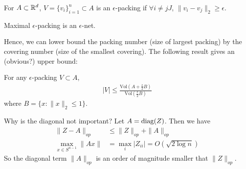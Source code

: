 \begin{definition}[Packing]
  For $A \subset \mathbb{R}^d$, $V = \{v_i\}_{i=1}^n \subset A$ is an
  $\epsilon$-packing if $\forall i \neq jJ$, $\| v_i - v_j\|_2 \geq \epsilon$.
\end{definition}

\begin{theorem}
  Maximal $\epsilon$-packing is an $\epsilon$-net.
\end{theorem}

Hence, we can lower bound the packing number (size of largest packing)
by the covering number (size of the smallest covering).
The following result gives an (obvious?) upper bound:

\begin{lemma}
  For any $\epsilon$-packing $V \subset A$,
  \begin{align}
    \lvert V \rvert
    \leq \frac{\text{Vol}(A + \frac{\epsilon}{2} B)}{\text{Vol}(\frac{\epsilon}{2} B)}
  \end{align}
  where $B = \{x : \|x\|_2 \leq 1\}$.
\end{lemma}


Why is the diagonal not important? Let $A = \operatorname{diag}(Z)$. Then we have
\begin{align}
  \|Z - A\|_{op}
  &\leq \|Z\|_{op} + \|A\|_{op} \\
  \max_{x \in S^{n-1}} \| A x \| &= \max_i \lvert Z_{ii} \rvert = O(\sqrt{2 \log n})
\end{align}
So the diagonal term $\|A\|_{op}$ is an order of magnitude
smaller that $\|Z\|_{op}$.


